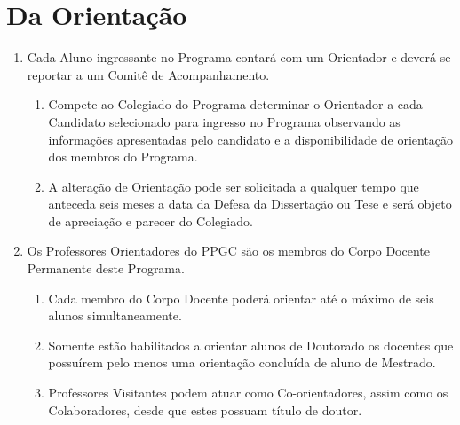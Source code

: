 \documentclass{article}
\begin{document}
\section{Da Orientação}

\begin{enumerate}
	\item Cada Aluno ingressante no Programa contará com um Orientador e deverá se reportar a um Comitê de Acompanhamento.
	\begin{enumerate}
		\item Compete ao Colegiado do Programa determinar o Orientador a cada Candidato selecionado para ingresso no Programa observando as informações apresentadas pelo candidato e a disponibilidade de orientação dos membros do Programa.
		\item A alteração de Orientação pode ser solicitada a qualquer tempo que anteceda seis meses a data da Defesa da Dissertação ou Tese e será objeto de apreciação e parecer do Colegiado.
	\end{enumerate}

	\item Os Professores Orientadores do PPGC são os membros do Corpo Docente Permanente deste Programa. 
	\begin{enumerate}
		\item Cada membro do Corpo Docente poderá orientar até o máximo de seis alunos simultaneamente.
		\item  Somente estão habilitados a orientar alunos de Doutorado os docentes que possuírem pelo menos uma orientação concluída de aluno de Mestrado.
		\item  Professores Visitantes podem atuar como Co-orientadores, assim como os Colaboradores, desde que estes possuam título de doutor.
	\end{enumerate}


\end{enumerate}
\end{document}
